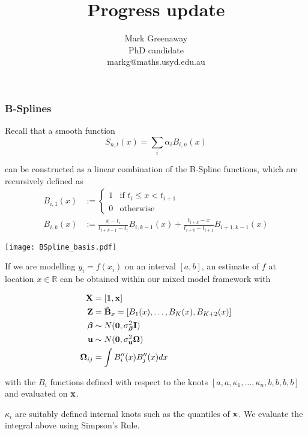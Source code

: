 \documentclass{beamer}
\title{Progress update}
\author{Mark Greenaway\\PhD candidate\\markg@maths.usyd.edu.au}
\begin{document}
\begin{frame}
\titlepage
\end{frame}

\begin{frame}
\frametitle{B-Splines}
Recall that a smooth function
\[
	S_{n, t}(x) = \sum_i \alpha_i B_{i, n} (x)
\]

can be constructed as a linear combination of the B-Spline functions, which are recursively
defined as
\begin{align*}
	B_{i, 1} (x) &:= 
	\begin{cases}
		1 & \text{if } t_i \leq x < t_{i + 1} \\
		0 & \text{otherwise}
	\end{cases} \\
	B_{i, k} (x) &:= \frac{x - t_i}{t_{i + k - 1} - t_i} B_{i, k - 1}(x) +
									\frac{t_{i + k} - x}{t_{i + k} - t_{i + 1}} B_{i + 1, k - 1} (x)
\end{align*}


\texttt{[image: BSpline\_basis.pdf]}
\end{frame}

\begin{frame}
If we are modelling $y_i = f(x_i)$ on an interval $[a, b]$, an estimate of $f$ at location
$x \in \mathbb{R}$ can be obtained within our mixed model framework with

\begin{align*}
	{\bf X} &= [{\bf 1}, {\bf x}] \\
	{\bf Z} &= \tilde {{\bf B}}_x = [B_1(x), \ldots, B_K(x), B_{K+2}(x)]\\
	{\boldsymbol \beta} &\sim N({\bf 0}, \sigma_{\boldsymbol \beta}^2 {\bf I}) \\
	{\bf u} &\sim N({\bf 0}, \sigma_{\bf u}^2 {\boldsymbol \Omega}) \\
	{\boldsymbol \Omega}_{ij} &= \int B''_i(x) B''_j(x) dx \\
\end{align*}

with the $B_i$ functions defined with respect to the knots $[a, a, \kappa_1, \ldots,
\kappa_n, b, b, b, b]$ and evaluated on ${\bf x}$.

$\kappa_i$ are suitably defined internal knots such as the quantiles of ${\bf x}$. We evaluate 
the integral above using Simpson's Rule.
\end{frame}
\end{document}

